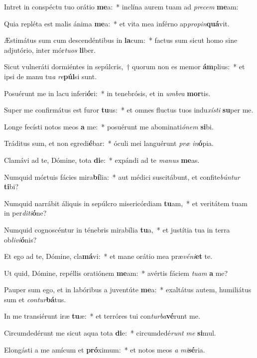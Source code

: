 \item Intret in conspéctu tuo orátio \textbf{me}a:~* inclína aurem tuam ad \textit{precem} \textbf{me}am:
\item Quia repléta est malis ánima \textbf{me}a:~* et vita mea inférno ap\textit{propin}\textbf{quá}vit.
\item Æstimátus sum cum descendéntibus in \textbf{la}cum:~* factus sum sicut homo sine adjutório, inter mór\textit{tuos} \textbf{li}ber.
\item Sicut vulneráti dormiéntes in sepúlcris,~† quorum non es memor \textbf{ám}plius:~* et ipsi de manu tu\textit{a} \textit{re}\textbf{púl}si sunt.
\item Posuérunt me in lacu inferi\textbf{ó}ri:~* in tenebrósis, et in \textit{umbra} \textbf{mor}tis.
\item Super me confirmátus est furor \textbf{tu}us:~* et omnes fluctus tuos indu\textit{xísti} \textbf{su}per me.
\item Longe fecísti notos meos \textbf{a} me:~* posuérunt me abominati\textit{ónem} \textbf{si}bi.
\item Tráditus sum, et non egredi\textbf{é}bar:~* óculi mei languérunt \textit{præ} \textit{in}\textbf{ó}pia.
\item Clamávi ad te, Dómine, tota \textbf{di}e:~* expándi ad te \textit{manus} \textbf{me}as.
\item Numquid mórtuis fácies mira\textbf{bí}lia:~* aut médici suscitábunt, et confite\textit{búntur} \textbf{ti}bi?
\item Numquid narrábit áliquis in sepúlcro misericórdiam \textbf{tu}am,~* et veritátem tuam in per\textit{diti}\textbf{ó}ne?
\item Numquid cognoscéntur in ténebris mirabília \textbf{tu}a,~* et justítia tua in terra ob\textit{livi}\textbf{ó}nis?
\item Et ego ad te, Dómine, cla\textbf{má}vi:~* et mane orátio mea præ\textit{véni}\textbf{et} te.
\item Ut quid, Dómine, repéllis oratiónem \textbf{me}am:~* avértis fáciem \textit{tuam} \textbf{a} me?
\item Pauper sum ego, et in labóribus a juventúte \textbf{me}a:~* exaltátus autem, humiliátus sum et \textit{contur}\textbf{bá}tus.
\item In me transiérunt iræ \textbf{tu}æ:~* et terróres tui con\textit{turba}\textbf{vé}runt me.
\item Circumdedérunt me sicut aqua tota \textbf{di}e:~* circumdedé\textit{runt} \textit{me} \textbf{si}mul.
\item Elongásti a me amícum et \textbf{pró}ximum:~* et notos meos \textit{a} \textit{mi}\textbf{sé}ria.
